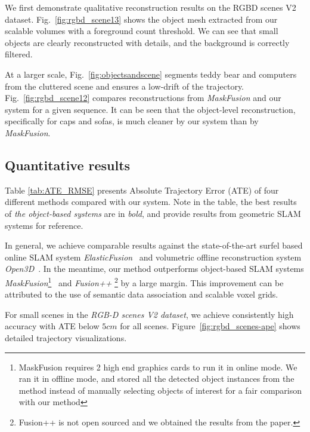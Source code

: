 We first demonstrate qualitative reconstruction results on the RGBD scenes V2 dataset.  Fig.~\ref{fig:rgbd_scene13} shows the object mesh extracted from our scalable volumes with a foreground count threshold. We can see that small objects are clearly reconstructed with details, and the background is correctly filtered.

At a larger scale, Fig.~\ref{fig:objectsandscene} segments teddy bear and computers from the cluttered scene and ensures a low-drift of the trajectory. Fig.~\ref{fig:rgbd_scene12} compares reconstructions from \textit{MaskFusion} \cite{runz_maskfusion_2018} and our system for a given sequence. It can be seen that the object-level reconstruction, specifically for caps and sofas, is much cleaner by our system than by \textit{MaskFusion}.


\subsection{Quantitative results}

Table \ref{tab:ATE_RMSE} presents Absolute Trajectory Error (ATE) of four different methods compared with our system. Note in the table, the best results of \textit{the object-based systems} are in \textit{bold}, and provide results from geometric SLAM systems for reference.

In general, we achieve comparable results against the state-of-the-art surfel based online SLAM system \textit{ElasticFusion}~\cite{whelan2016elasticfusion} and volumetric offline reconstruction system \textit{Open3D}~\cite{zhou_open3d_2018}. In the meantime, our method outperforms object-based SLAM systems \textit{MaskFusion}\footnote{MaskFusion requires 2 high end graphics cards to run it in online mode. We ran it in offline mode, and stored all the detected object instances from the method instead of manually selecting objects of interest for a fair comparison with our method}~\cite{runz_maskfusion_2018}
and \textit{Fusion++} \footnote{Fusion++ is not open sourced and we obtained the results from the paper.}\cite{fusionPP} by a large margin. This improvement can be attributed to the use of semantic data association and scalable voxel grids.

For small scenes in the \textit{RGB-D scenes V2 dataset}, we achieve consistently high accuracy with ATE below $5cm$ for all scenes. Figure~\ref{fig:rgbd_scenes-ape} shows detailed trajectory visualizations.

